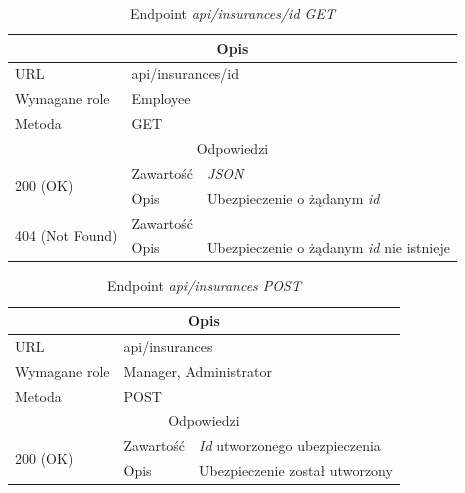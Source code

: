 \documentclass[eng,printmode,openany]{mgr}
\begin{document}
\begin{table}[H]
	\caption{Endpoint \textit{api/insurances/id GET}}
	\begin{tabularx}{\textwidth}{|l|l|X|}
		\hline
		\multicolumn{3}{|c|}{Opis}
		\\ \hline
		URL                         & \multicolumn{2}{l|}{api/insurances/id}
		\\ \hline
		Wymagane role               & \multicolumn{2}{l|}{Employee}
		\\ \hline
		Metoda                      & \multicolumn{2}{l|}{GET}
		\\ \hline
		\multicolumn{3}{|c|}{Odpowiedzi}
		\\ \hline
		\multirow{2}{*}{200 (OK)} 	        & Zawartość   	& \textit{JSON}
		\\ \cline{2-3}                      & Opis         	& Ubezpieczenie o żądanym \textit{id}
		\\ \hline
		\multirow{2}{*}{404 (Not Found)} 	& Zawartość     & 
		\\ \cline{2-3}                      & Opis          & Ubezpieczenie o żądanym \textit{id} nie istnieje
		\\ \hline
	\end{tabularx}
\end{table}

\begin{table}[H]
	\caption{Endpoint \textit{api/insurances POST}}
	\begin{tabularx}{\textwidth}{|l|l|X|}
		\hline
		\multicolumn{3}{|c|}{Opis}
		\\ \hline
		URL                       & \multicolumn{2}{l|}{api/insurances}
		\\ \hline
		Wymagane role             & \multicolumn{2}{l|}{Manager, Administrator}
		\\ \hline
		Metoda                    & \multicolumn{2}{l|}{POST}
		\\ \hline
		\multicolumn{3}{|c|}{Odpowiedzi}
		\\ \hline
		\multirow{2}{*}{200 (OK)} 		& Zawartość     & \textit{Id} utworzonego ubezpieczenia
		\\ \cline{2-3}                  & Opis         	& Ubezpieczenie został utworzony
		\\ \hline
	\end{tabularx}
\end{table}
\end{document}
